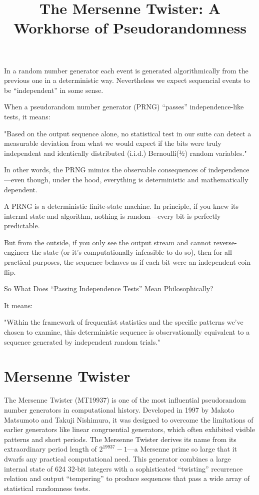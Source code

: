 \documentclass[12pt]{article}
\title{The Mersenne Twister: A Workhorse of Pseudorandomness}
\author{}
\date{}
\begin{document}
\maketitle

\Large

In a random number generator each event is generated algorithmically from the previous one in a deterministic way. Nevertheless we expect sequencial events to be ``independent'' in some sense.

When a pseudorandom number generator (PRNG) “passes” independence-like tests, it means: 

    "Based on the output sequence alone, no statistical test in our suite can detect a measurable deviation from what we would expect if the bits were truly independent and identically distributed (i.i.d.) Bernoulli(½) random variables." 
     
In other words, the PRNG mimics the observable consequences of independence—even though, under the hood, everything is deterministic and mathematically dependent.

A PRNG is a deterministic finite-state machine. In principle, if you knew its internal state and algorithm, nothing is random—every bit is perfectly predictable. 

But from the outside, if you only see the output stream and cannot reverse-engineer the state (or it’s computationally infeasible to do so), then for all practical purposes, the sequence behaves as if each bit were an independent coin flip. 

So What Does “Passing Independence Tests” Mean Philosophically? 

It means: 

    "Within the framework of frequentist statistics and the specific patterns we’ve chosen to examine, this deterministic sequence is observationally equivalent to a sequence generated by independent random trials." 
     

\section{Mersenne Twister}

The Mersenne Twister (MT19937) is one of the most influential pseudorandom number generators in computational history. Developed in 1997 by Makoto Matsumoto and Takuji Nishimura, it was designed to overcome the limitations of earlier generators like linear congruential generators, which often exhibited visible patterns and short periods. The Mersenne Twister derives its name from its extraordinary period length of $2^{19937} - 1$---a Mersenne prime so large that it dwarfs any practical computational need. This generator combines a large internal state of 624 32-bit integers with a sophisticated ``twisting'' recurrence relation and output ``tempering'' to produce sequences that pass a wide array of statistical randomness tests.
\end{document}
